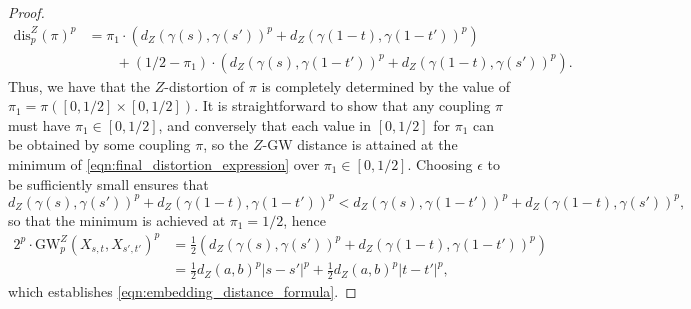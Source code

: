\documentclass{article}
\theoremstyle{definition}
\newcommand{\dgwz}{\mathrm{GW}_p^Z}
\begin{document}
\begin{proof}
\begin{equation}
    \begin{split}
        \mathrm{dis}_p^Z(\pi)^p &= \pi_1 \cdot \left(d_Z(\gamma(s), \gamma(s'))^p + d_Z(\gamma(1-t), \gamma(1-t'))^p\right)  \\  &\qquad + (1/2 - \pi_1) \cdot \left(d_Z(\gamma(s), \gamma(1-t'))^p + d_Z(\gamma(1-t), \gamma(s'))^p\right).
    \end{split}
    \end{equation}
    Thus, we have that the $Z$-distortion of $\pi$ is completely determined by the value of $\pi_1 = \pi([0,1/2]\times [0,1/2])$. It is straightforward to show that any coupling $\pi$ must have $\pi_1 \in [0,1/2]$, and conversely that each value in $[0,1/2]$ for $\pi_1$ can be obtained by some coupling $\pi$, so the $Z$-GW distance is attained at the minimum of \eqref{eqn:final_distortion_expression} over $\pi_1 \in [0, 1/2]$. Choosing $\epsilon$ to be sufficiently small ensures that 
    \[
    d_Z(\gamma(s), \gamma(s'))^p + d_Z(\gamma(1-t), \gamma(1-t'))^p < d_Z(\gamma(s), \gamma(1-t'))^p + d_Z(\gamma(1-t), \gamma(s'))^p,
    \]
    so that the minimum is achieved at $\pi_1 = 1/2$, hence
    \begin{align}
        2^p \cdot \dgwz(X_{s,t}, X_{s', t'})^p &= \frac{1}{2}\left(d_Z(\gamma(s), \gamma(s'))^p + d_Z(\gamma(1-t), \gamma(1-t'))^p\right) \\
        &= \frac{1}{2} d_Z(a,b)^p |s-s'|^p + \frac{1}{2} d_Z(a,b)^p |t-t'|^p,
    \end{align}
    which establishes  \eqref{eqn:embedding_distance_formula}. 
    

\end{proof}
\end{document}
